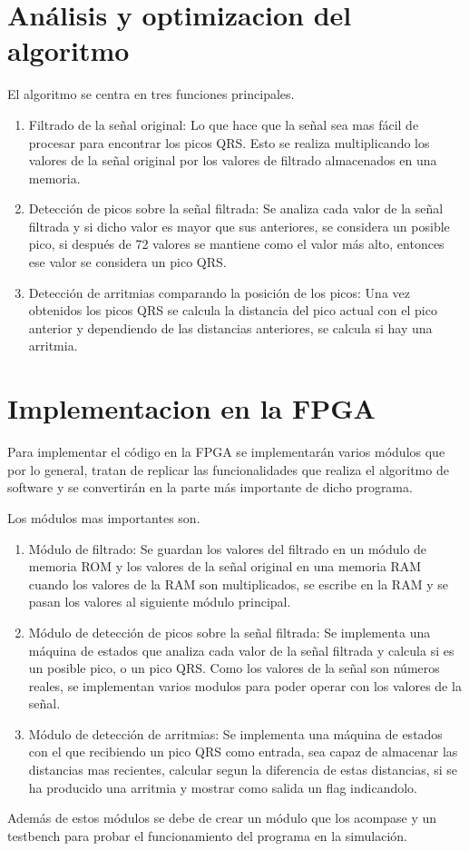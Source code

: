 \section{Análisis y optimizacion del algoritmo}
El algoritmo se centra en tres funciones principales.
\begin{enumerate}
	\item Filtrado de la señal original: Lo que hace que la señal sea mas fácil de procesar para encontrar los picos QRS.
	 Esto se realiza multiplicando los valores de la señal original por los valores de filtrado almacenados en una memoria.
	\item Detección de picos sobre la señal filtrada: Se analiza cada valor de la señal filtrada y si dicho valor es mayor que
	 sus anteriores, se considera un posible pico, si después de 72 valores se mantiene como el valor más alto, entonces ese valor
	 se considera un pico QRS.
	\item Detección de arritmias comparando la posición de los picos: Una vez obtenidos los picos QRS se calcula la distancia
	 del pico actual con el pico anterior y dependiendo de las distancias anteriores, se calcula si hay una arritmia.
\end{enumerate}


\section{Implementacion en la FPGA}
Para implementar el código en la FPGA se implementarán varios módulos que por lo general, tratan de replicar las funcionalidades que realiza
el algoritmo de software y se convertirán en la parte más importante de dicho programa.  

Los módulos mas importantes son.

	\begin{enumerate}
		\item Módulo de filtrado: Se guardan los valores del filtrado en un módulo de memoria ROM y los valores de la señal original en una memoria RAM 
		cuando los valores de la RAM son multiplicados, se escribe en la RAM y se pasan los valores al siguiente módulo principal.
		\item Módulo de detección de picos sobre la señal filtrada: Se implementa una máquina de estados que analiza cada valor de
		 la señal filtrada y calcula si es un posible pico, o un pico QRS. Como los valores de la señal son números reales, se implementan varios modulos para
		 poder operar con los valores de la señal. 
		\item Módulo de detección de arritmias: Se implementa una máquina de estados con el que recibiendo un pico QRS como entrada, sea capaz de almacenar las
		 distancias mas recientes, calcular segun la diferencia de estas distancias, si se ha producido una arritmia y mostrar como salida un flag indicandolo.
	\end{enumerate}
	
	Además de estos módulos se debe de crear un módulo que los acompase y un testbench para probar el funcionamiento del programa en la simulación.